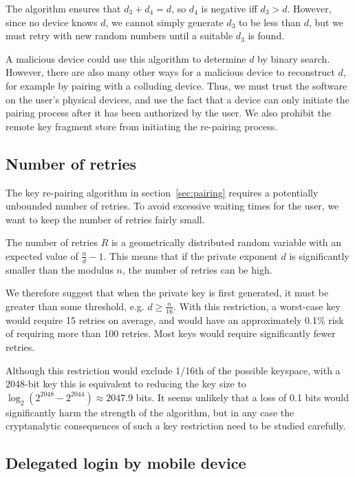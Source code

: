 The algorithm ensures that $d_3 + d_4 = d$, so $d_4$ is negative iff $d_3 > d$. However, since no
device knows $d$, we cannot simply generate $d_3$ to be less than $d$, but we must retry with new
random numbers until a suitable $d_3$ is found.

A malicious device could use this algorithm to determine $d$ by binary search. However, there are
also many other ways for a malicious device to reconstruct $d$, for example by pairing with a
colluding device. Thus, we must trust the software on the user's physical devices, and use the fact
that a device can only initiate the pairing process after it has been authorized by the user. We
also prohibit the remote key fragment store from initiating the re-pairing process.

\subsection{Number of retries}\label{sec:retries}

The key re-pairing algorithm in section~\ref{sec:pairing} requires a potentially unbounded
number of retries. To avoid excessive waiting times for the user, we want to keep the number of
retries fairly small.

The number of retries $R$ is a geometrically distributed random variable with an expected value of
$\frac{n}{d}-1$. This means that if the private exponent $d$ is significantly smaller than the
modulus $n$, the number of retries can be high.

We therefore suggest that when the private key is first generated, it must be greater than some
threshold, e.g. $d \ge \frac{n}{16}$. With this restriction, a worst-case key would require 15
retries on average, and would have an approximately 0.1\% risk of requiring more than 100 retries.
Most keys would require significantly fewer retries.

Although this restriction would exclude 1/16th of the possible keyspace, with a 2048-bit key this is
equivalent to reducing the key size to $\log_2(2^{2048} - 2^{2044}) \approx 2047.9$ bits. It seems
unlikely that a loss of 0.1 bits would significantly harm the strength of the algorithm, but in any
case the cryptanalytic consequences of such a key restriction need to be studied carefully.

\subsection{Delegated login by mobile device}\label{sec:delegation}

